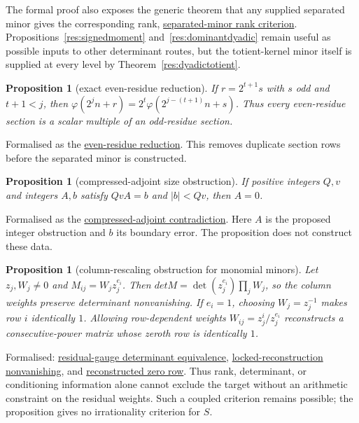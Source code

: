 \documentclass[11pt]{article}
\newcommand{\commit}{ebc98ee71f6819bd9fe344a0bb343542c604e533}
\newcommand{\repobase}{https://github.com/wcook04/plectis-lean-erdos249-257/blob/\commit}
\newcommand{\PK}{Erdos249257}
\newcommand{\lword}[4]{\href{\repobase/\PK/#1\#L#2}{#4}}
\newtheorem{proposition}[theorem]{Proposition}
\theoremstyle{definition}
\theoremstyle{remark}
\newcommand{\ph}{\varphi}
\begin{document}
{The formal proof also exposes the generic theorem that any supplied separated
minor gives the corresponding rank,
\lword{TotientMahlerDefect.lean}{101}{finrank_canonicalTotientKernel_eq_of_certificate}{separated-minor rank criterion}.
Propositions~\ref{res:signedmoment} and~\ref{res:dominantdyadic} remain useful
as possible inputs to other determinant routes, but the totient-kernel minor
itself is supplied at every level by Theorem~\ref{res:dyadictotient}.

\begin{proposition}[exact even-residue reduction]\label{res:evenresidue}
If $r=2^{t+1}s$ with $s$ odd and $t+1<j$, then
$\ph(2^jn+r)=2^t\ph(2^{j-(t+1)}n+s)$.  Thus every even-residue section is a
scalar multiple of an odd-residue section.
\end{proposition}
\noindent Formalised as the
\lword{TotientMahlerDefect.lean}{159}{totientKernel_even_residue_reduce}{even-residue reduction}.
This removes duplicate section rows before the separated minor is constructed.

\begin{proposition}[compressed-adjoint size obstruction]\label{res:compressedadjoint}
If positive integers $Q,v$ and integers $A,b$ satisfy $QvA=b$ and
$|b|<Qv$, then $A=0$.
\end{proposition}
\noindent Formalised as the
\lword{TotientMahlerDefect.lean}{1051}{false_of_compressedAdjointCertificate}{compressed-adjoint contradiction}.
Here $A$ is the proposed integer obstruction and $b$ its boundary error.  The
proposition does not construct these data.

\begin{proposition}[column-rescaling obstruction for monomial minors]\label{res:residualgauge}
Let $z_j,W_j\ne0$ and $M_{ij}=W_jz_j^{e_i}$.  Then
\(det M=\det(z_j^{e_i})\prod_jW_j\), so the column weights preserve
determinant nonvanishing.  If $e_i=1$, choosing $W_j=z_j^{-1}$ makes row $i$
identically $1$.  Allowing row-dependent weights
$W_{ij}=z_j^i/z_j^{e_i}$ reconstructs a consecutive-power matrix whose
zeroth row is identically $1$.
\end{proposition}
\noindent Formalised:
\lword{ResidualGaugeObstruction.lean}{55}{det_residualMonomialMatrix_ne_zero_iff}{residual-gauge determinant equivalence},
\lword{ResidualGaugeObstruction.lean}{94}{locked_reconstruction_preserves_nonzero_minor}{locked-reconstruction nonvanishing}, and
\lword{ResidualGaugeObstruction.lean}{145}{rowReconstruction_zero_row_one}{reconstructed zero row}.
Thus rank, determinant, or conditioning information alone cannot exclude the
target without an arithmetic constraint on the residual weights.  Such a
coupled criterion remains possible; the proposition gives no irrationality
criterion for $S$.

}
\end{document}
